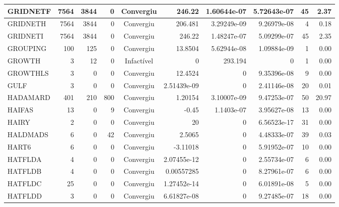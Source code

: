 \begin{center}
\begin{longtable}{|l|r|r|r|c|r|r|r|r|r|}
GRIDNETF &   7564 &   3844 &      0 & Convergiu  &      246.22 &    1.60644e-07 & 5.72643e-07 &     45 &    2.37 \\ \hline
GRIDNETH &   7564 &   3844 &      0 & Convergiu  &     206.481 &    3.29249e-09 & 9.26979e-08 &      4 &    0.18 \\ \hline
GRIDNETI &   7564 &   3844 &      0 & Convergiu  &      246.22 &    1.48247e-07 & 5.09299e-07 &     45 &    2.35 \\ \hline
GROUPING &    100 &    125 &      0 & Convergiu  &     13.8504 &    5.62944e-08 & 1.09884e-09 &      1 &    0.00 \\ \hline
  GROWTH &      3 &     12 &      0 & Infactível &           0 &        293.194 &           0 &      1 &    0.00 \\ \hline
GROWTHLS &      3 &      0 &      0 & Convergiu  &     12.4524 &              0 & 9.35396e-08 &      9 &    0.00 \\ \hline
    GULF &      3 &      0 &      0 & Convergiu  & 2.51439e-09 &              0 & 2.41146e-08 &     20 &    0.01 \\ \hline
HADAMARD &    401 &    210 &    800 & Convergiu  &     1.20154 &    3.10007e-09 & 9.47253e-07 &     50 &   20.97 \\ \hline
  HAIFAS &     13 &      0 &      9 & Convergiu  &       -0.45 &     1.1403e-07 & 3.95627e-08 &     13 &    0.00 \\ \hline
   HAIRY &      2 &      0 &      0 & Convergiu  &          20 &              0 & 6.56523e-17 &     31 &    0.00 \\ \hline
HALDMADS &      6 &      0 &     42 & Convergiu  &      2.5065 &              0 & 4.48333e-07 &     39 &    0.03 \\ \hline
   HART6 &      6 &      0 &      0 & Convergiu  &    -3.11018 &              0 & 5.91952e-07 &     10 &    0.00 \\ \hline
 HATFLDA &      4 &      0 &      0 & Convergiu  & 2.07455e-12 &              0 & 2.55734e-07 &      6 &    0.00 \\ \hline
 HATFLDB &      4 &      0 &      0 & Convergiu  &  0.00557285 &              0 & 8.27961e-07 &      6 &    0.00 \\ \hline
 HATFLDC &     25 &      0 &      0 & Convergiu  & 1.27452e-14 &              0 & 6.01891e-08 &      5 &    0.00 \\ \hline
 HATFLDD &      3 &      0 &      0 & Convergiu  & 6.61827e-08 &              0 & 9.27485e-07 &     18 &    0.00 \\ \hline

\end{longtable}
\end{center}
